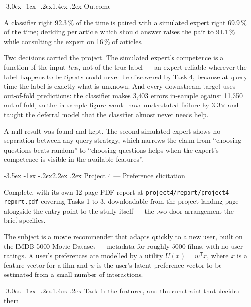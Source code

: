 \documentclass[11pt,a4paper]{article}
\makeatletter
\renewcommand\section{\@startsection{section}{1}{\z@}%
  {-3.5ex \@plus -1ex \@minus -.2ex}{2.2ex \@plus.2ex}%
  {\normalfont\Large\sffamily\bfseries\color{accent}}}
\renewcommand\subsection{\@startsection{subsection}{2}{\z@}%
  {-3.0ex \@plus -1ex \@minus -.2ex}{1.4ex \@plus .2ex}%
  {\normalfont\large\sffamily\bfseries\color{accent}}}
\newcommand{\file}[1]{\texttt{\small #1}}
\makeatother
\begin{document}
\subsection{Outcome}

A classifier right 92.3\,\% of the time is paired with a simulated expert right
69.9\,\% of the time; deciding per article which should answer raises the pair to
94.1\,\% while consulting the expert on 16\,\% of articles.

Two decisions carried the project. The simulated expert's competence is a function
of the input \emph{text}, not of the true label --- an expert reliable wherever the
label happens to be Sports could never be discovered by Task 4, because at query
time the label is exactly what is unknown. And every downstream target uses
out-of-fold predictions: the classifier makes 3{,}403 errors in-sample against
11{,}350 out-of-fold, so the in-sample figure would have understated failure by
3.3$\times$ and taught the deferral model that the classifier almost never needs
help.

A null result was found and kept. The second simulated expert shows no separation
between any query strategy, which narrows the claim from ``choosing questions
beats random'' to ``choosing questions helps when the expert's competence is
visible in the available features''.

\section{Project 4 --- Preference elicitation}

Complete, with its own 12-page PDF report at
\file{project4/report/project4-report.pdf} covering Tasks 1 to 3, downloadable
from the project landing page alongside the entry point to the study itself ---
the two-door arrangement the brief specifies.

The subject is a movie recommender that adapts quickly to a new user, built on the
IMDB 5000 Movie Dataset --- metadata for roughly 5000 films, with no user ratings.
A user's preferences are modelled by a utility $U(x) = w^{\mathsf{T}}x$, where $x$
is a feature vector for a film and $w$ is the user's latent preference vector to
be estimated from a small number of interactions.

\subsection{Task 1: the features, and the constraint that decides them}
\end{document}
